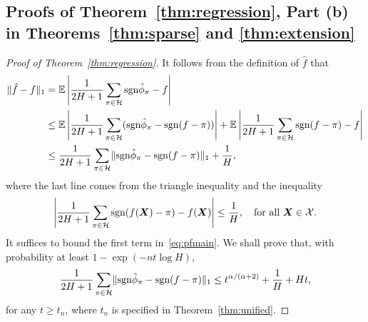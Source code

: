 \documentclass[11pt]{article}
\theoremstyle{plain}
\theoremstyle{definition}
\def\sign{\textup{sgn}}
\begin{document}
\subsection{Proofs of Theorem~\ref{thm:regression}, Part (b) in Theorems~\ref{thm:sparse} and \ref{thm:extension}}\label{sec:regression}
\begin{proof}[Proof of Theorem~\ref{thm:regression}]
It follows from the definition of $\hat f$ that
\begin{align}\label{eq:pfmain}
\onenormSize{}{\hat f-f}&=\mathbb{E}\left|{1\over 2H+1} \sum_{\pi\in \tH}\sign \hat \phi_\pi - f\right|\notag\\
&\leq \mathbb{E}\left|{1\over 2H+1}\sum_{\pi \in \tH} (\sign \hat \phi_\pi - \sign (f-\pi)) \right| +\mathbb{E}\left|{1\over 2H+1}\sum_{\pi \in \tH}\sign(f-\pi)-f\right|\notag\\
& \leq{1\over 2H+1}\sum_{\pi \in \tH}\onenormSize{}{\sign \hat \phi_\pi - \sign (f-\pi)}+{1\over H},
\end{align}
where the last line comes from the triangle inequality and the inequality
\[
\left|{1\over 2H+1}\sum_{\pi \in \tH}\sign(f(\mX)-\pi)-f(\mX)\right|\leq {1\over H}, \quad \text{for all } \mX\in\tX.
\]
It suffices to bound the first term in~\eqref{eq:pfmain}. We shall prove that, with probability at least $1-\exp(-nt\log H)$, 
\begin{equation}\label{eq:pfmain2}
{1\over 2H+1}\sum_{\pi \in \tH}\onenormSize{}{\sign \hat \phi_\pi - \sign (f-\pi)} \leq t^{\alpha/(\alpha+2)}+{1\over H}+Ht,
\end{equation}
for any $t\geq t_n$, where $t_n$ is specified in Theorem~\ref{thm:unified}. 


\end{proof}
\end{document}
